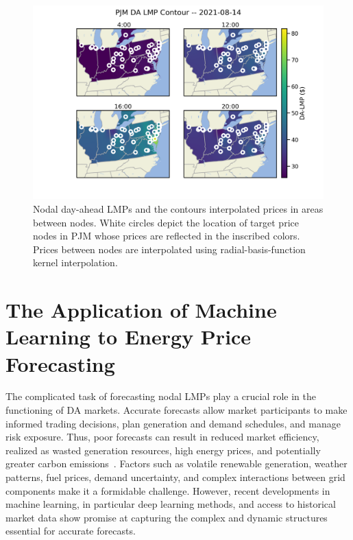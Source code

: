 \begin{figure}[htbp]
    \caption[Contour map of PJM DA LMPs at various times over a single market-day]{
        Nodal day-ahead LMPs and the contours interpolated prices in areas between nodes.
        White circles depict the location of target price nodes in PJM whose prices are reflected in the
        inscribed colors.
        Prices between nodes are interpolated using radial-basis-function kernel interpolation.
    }
    \begin{center}
        \setlength{\fboxsep}{0pt}%
        \setlength{\fboxrule}{1pt}%
        \includegraphics[width=150mm]{figs/pjm_lmp_contour_singlecbar}
    \end{center}
    \label{fig:contours}
\end{figure}

\section{The Application of Machine Learning to Energy Price Forecasting}\label{sec:the-application-of-machine-learning-to-price-forecasting}

The complicated task of forecasting nodal LMPs play a crucial role in the functioning of DA markets.
Accurate forecasts allow market participants to make informed trading decisions, plan generation and demand schedules,
and manage risk exposure.
Thus, poor forecasts can result in reduced market efficiency, realized as wasted generation resources, high energy
prices, and potentially greater carbon emissions~\cite{Surana2019}.
Factors such as volatile renewable generation, weather patterns, fuel prices, demand uncertainty, and complex
interactions between grid components make it a formidable challenge.
However, recent developments in machine learning, in particular deep learning methods, and access to historical market
data show promise at capturing the complex and dynamic structures essential for accurate forecasts.

